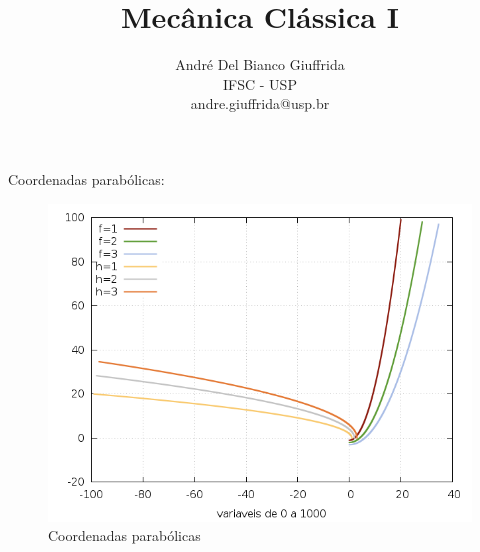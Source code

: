 \documentclass[a4paper,12pt]{article}
\title{ Mecânica Clássica I}
\author{\small André Del Bianco Giuffrida\\ \small IFSC - USP\\ \small andre.giuffrida@usp.br}
\date{}
\begin{document}
\maketitle
	Coordenadas parabólicas:
	
		\begin{figure}[h]
			\centering
			\includegraphics[scale=0.6]{1o1.png}
			\caption{Coordenadas parabólicas}
		\end{figure}


	
\end{document}
